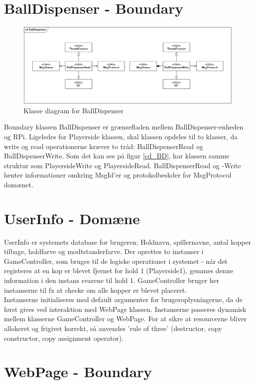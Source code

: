 \documentclass[Softwaredesign/Softwaredesign_main.tex]{subfiles}
\begin{document}
\section{BallDispenser - Boundary}
\begin{figure}[H]
    \centering
    \includegraphics[width=1\textwidth]{Softwaredesign/RPiApp/graphic_RPi/BD.png}
    \caption{Klasse diagram for BallDispenser}
   \label{fig:cd_BD}
\end{figure}
Boundary klassen BallDispenser er grænsefladen mellem BallDispenser-enheden og RPi. Ligeledes for Playerside klassen, skal klassen opdeles til to klasser, da write og read operationerne kræver to tråd: BallDispenserRead og BallDispenserWrite. Som det kan ses på figur \ref{cd_BD}, har klassen samme struktur som PlayersideWrite og PlayersideRead. BallDispenserRead og -Write henter informationer omkring MsgId'er og protokolbeskder for MsgProtocol domænet. 

\section{UserInfo - Domæne}
UserInfo er systemets database for brugeren; Holdnavn, spillernavne, antal kopper tilbage, holdfarve og modtstanderfarve. Der oprettes to instanser i GameController, som bruges til de logiske operationer i systemet - når det registeres at en kop er blevet fjernet for hold 1 (Playerside1), gemmes denne information i den instans svarene til hold 1. GameController bruger her instanserne til fx at checke om alle kopper er blevet placeret. \\
Instanserne initialiseres med default argumenter for brugeroplysningerne, da de først gives ved interaktion med WebPage klassen. Instanserne passeres dynamisk mellem klasserne GameController og WebPage. For at sikre at resourcerne bliver allokeret og frigivet korrekt, så anvendes 'rule of three' (destructor, copy constructor, copy assignment operator). 

\section{WebPage - Boundary}
\end{document}
